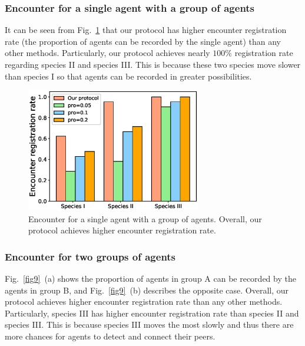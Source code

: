 \subsubsection{Encounter for a single 
agent with a group of agents}

It can be seen from Fig.~\ref{fig8} that 
our protocol has higher encounter
registration rate (the proportion of agents can 
be recorded by the single agent) than any other methods.
Particularly, our protocol achieves nearly $100\%$ registration
rate regarding species II and species III.
This is because these two species move slower than species I 
so that agents can be recorded in greater possibilities. 

\begin{figure}[!h]
    \centering
    \includegraphics[width=3in]{figures/figure8.eps}
    \caption{Encounter for a single 
    agent with a group of agents. Overall, our protocol
    achieves higher encounter registration rate.}
    \label{fig8}
\end{figure}

\subsubsection{Encounter for two groups of agents}

Fig.~\ref{fig9}~(a) shows the proportion of agents in group A can 
be recorded by the agents in group B, and Fig.~\ref{fig9}~(b) describes
the opposite case. Overall, our protocol achieves higher encounter 
registration rate than any other methods. Particularly, species III
has higher encounter registration rate than species II and species III.
This is because species III moves the most slowly and thus there are more 
chances for agents to detect and connect their peers. 

